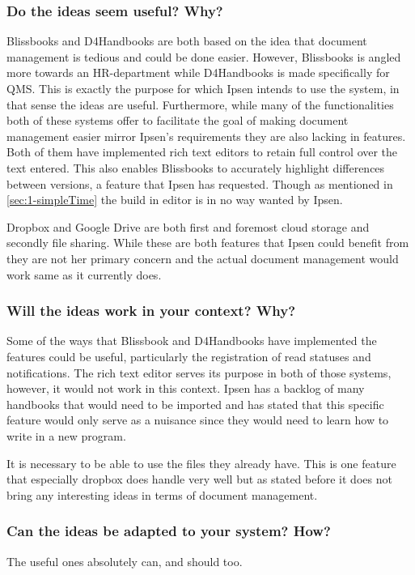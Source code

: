 \subsubsection*{Do the ideas seem useful? Why?}

Blissbooks and D4Handbooks are both based on the idea that document management is tedious and could be done easier.
However, Blissbooks is angled more towards an HR-department while D4Handbooks is made specifically for QMS.
This is exactly the purpose for which Ipsen intends to use the system, in that sense the ideas are useful.
Furthermore, while many of the functionalities both of these systems offer to facilitate the goal of making document management easier mirror Ipsen's requirements they are also lacking in features.
Both of them have implemented rich text editors to retain full control over the text entered. 
This also enables Blissbooks to accurately highlight differences between versions, a feature that Ipsen has requested.
Though as mentioned in \cref{sec:1-simpleTime} the build in editor is in no way wanted by Ipsen.

Dropbox and Google Drive are both first and foremost cloud storage and secondly file sharing. 
While these are both features that Ipsen could benefit from they are not her primary concern and the actual document management would work same as it currently does.

\subsubsection*{Will the ideas work in your context? Why?}

Some of the ways that Blissbook and D4Handbooks have implemented the features could be useful, particularly the registration of read statuses and notifications.
The rich text editor serves its purpose in both of those systems, however, it would not work in this context.
Ipsen has a backlog of many handbooks that would need to be imported and has stated that this specific feature would only serve as a nuisance since they would need to learn how to write in a new program.

It is necessary to be able to use the files they already have.
This is one feature that especially dropbox does handle very well but as stated before it does not bring any interesting ideas in terms of document management.

\subsubsection*{Can the ideas be adapted to your system? How?}

The useful ones absolutely can, and should too.
